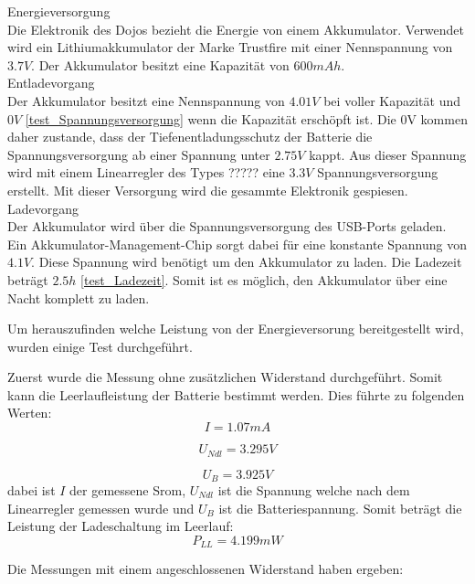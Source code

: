 Energieversorgung\\
Die Elektronik des Dojos bezieht die Energie von einem Akkumulator. Verwendet wird ein Lithiumakkumulator der Marke Trustfire mit einer Nennspannung von $3.7V$. Der Akkumulator besitzt eine Kapazität von $600mAh$.\\

Entladevorgang\\ 
Der Akkumulator besitzt eine Nennspannung von $4.01V$ bei voller Kapazität und $0V$ \ref{test_Spannungsversorgung} wenn die Kapazität erschöpft ist. Die 0V kommen daher zustande, dass der Tiefenentladungsschutz der Batterie die Spannungsversorgung ab einer Spannung unter $2.75V$ kappt. Aus dieser Spannung wird mit einem Linearregler des Types ????? eine $3.3V$ Spannungsversorgung erstellt. Mit dieser Versorgung wird die gesammte Elektronik gespiesen.\\

Ladevorgang\\
Der Akkumulator wird über die Spannungsversorgung des USB-Ports geladen. Ein Akkumulator-Management-Chip sorgt dabei für eine konstante Spannung von $4.1V$. Diese Spannung wird benötigt um den Akkumulator zu laden. Die Ladezeit beträgt $2.5h$ \ref{test_Ladezeit}. Somit ist es möglich, den Akkumulator über eine Nacht komplett zu laden. 


Um herauszufinden welche Leistung von der Energieversorung bereitgestellt wird, wurden einige Test durchgeführt.

Zuerst wurde die Messung ohne zusätzlichen Widerstand durchgeführt. Somit kann die Leerlaufleistung der Batterie bestimmt werden. Dies führte zu folgenden Werten:
\begin{equation}
I = 1.07mA
\end{equation}

\begin{equation}
U_{Ndl} = 3.295V
\end{equation}

\begin{equation}
U_{B} = 3.925V
\end{equation}
dabei ist $I$ der gemessene Srom, $U_{Ndl}$ ist die Spannung welche nach dem Linearregler gemessen wurde und $U_{B}$ ist die Batteriespannung. Somit beträgt die Leistung der Ladeschaltung im Leerlauf:
\begin{equation}
P_{LL}  = 4.199mW
\end{equation}

Die Messungen mit einem angeschlossenen Widerstand haben ergeben: \\

